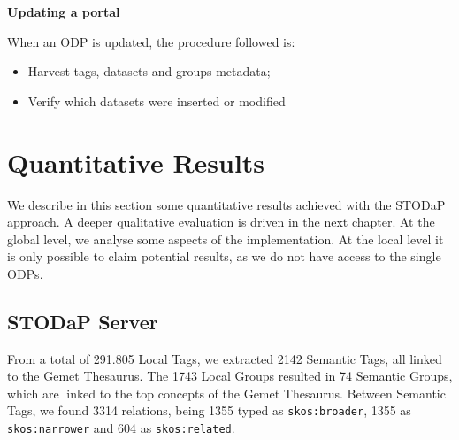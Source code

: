 \textbf{Updating a portal}

When an ODP is updated, the procedure followed is:
\begin{itemize}
	\item Harvest tags, datasets and groups metadata;
	\item Verify which datasets were inserted or modified
\end{itemize}

\section{Quantitative Results}
\label{sec:results}

We describe in this section some quantitative results achieved with the STODaP approach.
A deeper qualitative evaluation is driven in the next chapter.
At the global level, we analyse some aspects of the implementation.
At the local level it is only possible to claim potential results, as we do not have access to the single ODPs.

\subsection{STODaP Server}

From a total of 291.805 Local Tags, we extracted 2142 Semantic Tags, all linked to the Gemet Thesaurus.
The 1743 Local Groups resulted in 74 Semantic Groups, which are linked to the top concepts of the Gemet Thesaurus.
Between Semantic Tags, we found 3314 relations, being 1355 typed as \texttt{skos:broader}, 1355 as \texttt{skos:narrower} and 604 as \texttt{skos:related}.


